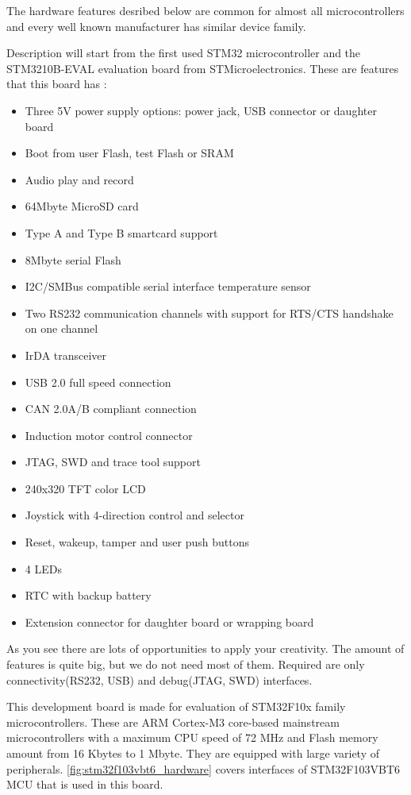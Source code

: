 The hardware features desribed below are common for almost all microcontrollers
and every well known manufacturer has similar device family.

Description will start from the first used STM32 microcontroller and
the STM3210B-EVAL evaluation board from STMicroelectronics.
These are features that this board has \cite{stm_eval_board_manual}:
\begin{itemize}
  \item Three 5V power supply options: power jack, USB connector or daughter
  board
  \item Boot from user Flash, test Flash or SRAM
  \item Audio play and record
  \item 64Mbyte MicroSD card
  \item Type A and Type B smartcard support
  \item 8Mbyte serial Flash
  \item I2C/SMBus compatible serial interface temperature sensor
  \item Two RS232 communication channels with support for RTS/CTS handshake on
  one channel
  \item IrDA transceiver
  \item USB 2.0 full speed connection
  \item CAN 2.0A/B compliant connection
  \item Induction motor control connector
  \item JTAG, SWD and trace tool support
  \item 240x320 TFT color LCD
  \item Joystick with 4-direction control and selector
  \item Reset, wakeup, tamper and user push buttons
  \item 4 LEDs
  \item RTC with backup battery
  \item Extension connector for daughter board or wrapping board 
\end{itemize}

As you see there are lots of opportunities to apply your creativity.
The amount of features is quite big, but we do not need most of them.
Required are only connectivity(RS232, USB) and debug(\gls{JTAG}, \gls{SWD}) interfaces.

This development board is made for evaluation of STM32F10x family
microcontrollers. These are ARM Cortex-M3 core-based mainstream microcontrollers
with a maximum CPU speed of 72 MHz and Flash memory amount from 16 Kbytes
to 1 Mbyte. They are equipped with large variety of peripherals.
\autoref{fig:stm32f103vbt6_hardware} covers interfaces of STM32F103VBT6 MCU that
is used in this board.

